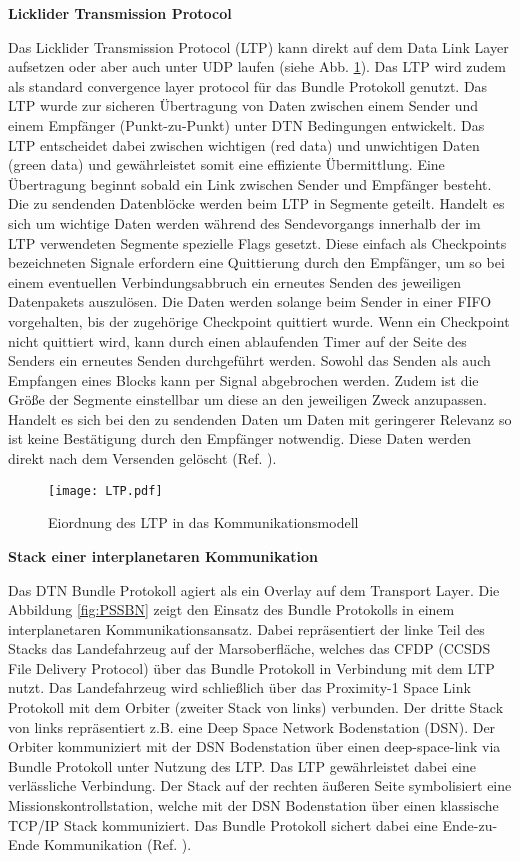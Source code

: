 \textbf{Licklider Transmission Protocol}

Das Licklider Transmission Protocol (LTP) kann direkt auf dem Data Link Layer
aufsetzen oder aber auch unter UDP laufen (siehe Abb. \ref{fig:LTP}). Das LTP
wird zudem als standard convergence layer protocol f{\"u}r das Bundle Protokoll
genutzt. Das LTP wurde zur sicheren {\"U}bertragung von Daten zwischen einem
Sender und einem Empf{\"a}nger (Punkt-zu-Punkt) unter DTN Bedingungen
entwickelt. Das LTP entscheidet dabei zwischen wichtigen (red data) und
unwichtigen Daten (green data) und gew{\"a}hrleistet somit eine effiziente
{\"U}bermittlung. Eine {\"U}bertragung beginnt sobald ein Link zwischen Sender
und Empf{\"a}nger besteht. Die zu sendenden Datenbl{\"o}cke werden beim LTP in
Segmente geteilt. Handelt es sich um wichtige Daten werden
w{\"a}hrend des Sendevorgangs innerhalb der im LTP verwendeten Segmente
spezielle Flags gesetzt.
Diese einfach als Checkpoints bezeichneten Signale erfordern eine Quittierung
durch den Empf{\"a}nger, um so bei einem eventuellen Verbindungsabbruch ein
erneutes Senden des jeweiligen Datenpakets auszul{\"o}sen. Die Daten werden
solange beim Sender in einer FIFO vorgehalten, bis der zugeh{\"o}rige
Checkpoint quittiert wurde. Wenn ein Checkpoint nicht quittiert wird, kann durch
einen ablaufenden Timer auf der Seite des Senders ein erneutes Senden
durchgeführt werden. Sowohl das Senden als auch Empfangen eines Blocks kann per
Signal abgebrochen werden. Zudem ist die Gr{\"o}{\ss}e der Segmente einstellbar um
diese an den jeweiligen Zweck anzupassen. Handelt es sich bei den zu sendenden
Daten um Daten mit geringerer Relevanz so ist keine
Best{\"a}tigung durch den Empf{\"a}nger notwendig.
Diese Daten werden direkt nach dem Versenden gel{\"o}scht (Ref. \cite{web4}).

\begin{figure}[H]
\centering
\texttt{[image: LTP.pdf]}
\caption{Eiordnung des LTP in das Kommunikationsmodell}
\label{fig:LTP}
\end{figure}

\textbf{Stack einer interplanetaren Kommunikation}

Das DTN Bundle Protokoll agiert als ein Overlay auf dem Transport Layer. Die
Abbildung \ref{fig:PSSBN} zeigt den Einsatz des Bundle Protokolls in einem interplanetaren Kommunikationsansatz.
Dabei repr{\"a}sentiert der linke Teil des Stacks das Landefahrzeug auf der
Marsoberfl{\"a}che, welches das CFDP (CCSDS File Delivery Protocol) {\"u}ber das
Bundle Protokoll in Verbindung mit dem LTP nutzt.
Das Landefahrzeug wird schlie{\ss}lich {\"u}ber das Proximity-1 Space Link
Protokoll mit dem Orbiter (zweiter Stack von links) verbunden. Der dritte Stack
von links repr{\"a}sentiert z.B. eine Deep Space Network Bodenstation (DSN). Der
Orbiter kommuniziert mit der DSN Bodenstation {\"u}ber einen deep-space-link via
Bundle Protokoll unter Nutzung des LTP. Das LTP gew{\"a}hrleistet dabei eine
verl{\"a}ssliche Verbindung. Der Stack auf der rechten {\"a}u{\ss}eren Seite
symbolisiert eine Missionskontrollstation, welche mit der DSN Bodenstation
{\"u}ber einen klassische TCP/IP Stack kommuniziert. Das Bundle Protokoll
sichert dabei eine Ende-zu-Ende Kommunikation (Ref. \cite{DTNBundle}).

